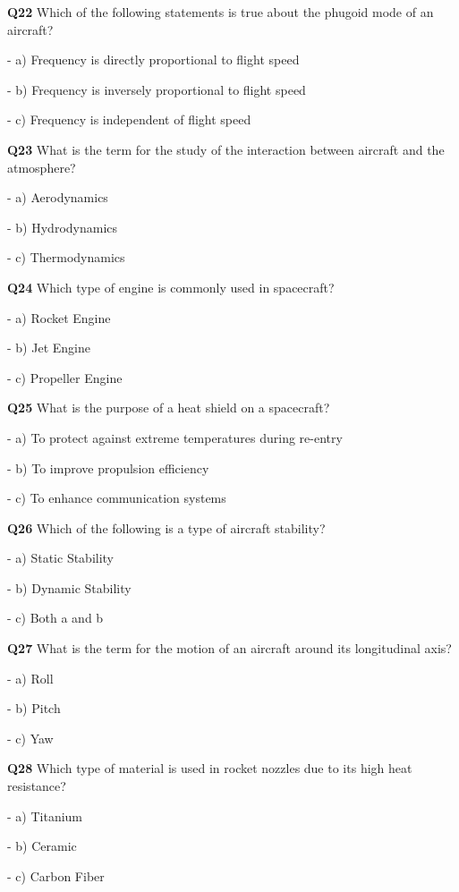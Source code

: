 \textbf{Q22} Which of the following statements is true about the phugoid mode of an aircraft?\par
\quad - a) Frequency is directly proportional to flight speed\par
\quad - b) Frequency is inversely proportional to flight speed\par
\quad - c) Frequency is independent of flight speed\par

\textbf{Q23} What is the term for the study of the interaction between aircraft and the atmosphere?\par
\quad - a) Aerodynamics\par
\quad - b) Hydrodynamics\par
\quad - c) Thermodynamics\par

\textbf{Q24} Which type of engine is commonly used in spacecraft?\par
\quad - a) Rocket Engine\par
\quad - b) Jet Engine\par
\quad - c) Propeller Engine\par

\textbf{Q25} What is the purpose of a heat shield on a spacecraft?\par
\quad - a) To protect against extreme temperatures during re-entry\par
\quad - b) To improve propulsion efficiency\par
\quad - c) To enhance communication systems\par

\textbf{Q26} Which of the following is a type of aircraft stability?\par
\quad - a) Static Stability\par
\quad - b) Dynamic Stability\par
\quad - c) Both a and b\par

\textbf{Q27} What is the term for the motion of an aircraft around its longitudinal axis?\par
\quad - a) Roll\par
\quad - b) Pitch\par
\quad - c) Yaw\par

\textbf{Q28} Which type of material is used in rocket nozzles due to its high heat resistance?\par
\quad - a) Titanium\par
\quad - b) Ceramic\par
\quad - c) Carbon Fiber\par


